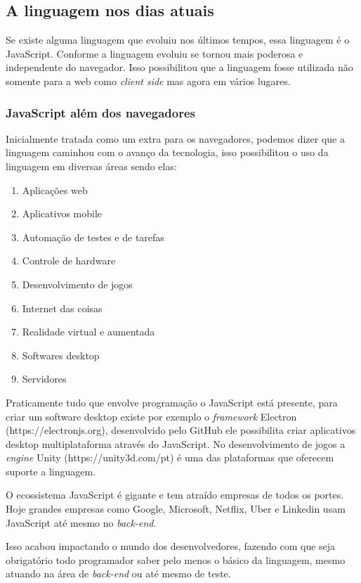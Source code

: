 \documentclass[
	12pt,				%
	openright,			%
	twoside,			%
	a4paper,			%
	english,			%
	brazil				%
	]{abntex2}
\begin{document}
\subsection{A linguagem nos dias atuais}

Se existe alguma linguagem que evoluiu nos últimos tempos, essa linguagem é o JavaScript. Conforme a linguagem evoluiu se tornou mais poderosa e independente do navegador. Isso possibilitou que a linguagem fosse utilizada não somente para a web como \textit{client side} mas agora em vários lugares. 

\subsubsection{JavaScript além dos navegadores}

Inicialmente tratada como um extra para os navegadores, podemos dizer que a linguagem caminhou com o avanço da tecnologia, isso possibilitou o uso da linguagem em diversas áreas sendo elas:

\begin{enumerate}[label=\alph*)]
\item Aplicações web
\item Aplicativos mobile 
\item Automação de testes e de tarefas
\item Controle de hardware
\item Desenvolvimento de jogos
\item Internet das coisas
\item Realidade virtual e aumentada
\item Softwares desktop
\item Servidores 
\end{enumerate}

Praticamente tudo que envolve programação o JavaScript está presente, para criar um software desktop existe por exemplo o \textit{framework} Electron (https://electronjs.org), desenvolvido pelo GitHub ele possibilita criar aplicativos desktop multiplataforma através do JavaScript. No desenvolvimento de jogos a \textit{engine} Unity (https://unity3d.com/pt) é uma das plataformas que oferecem suporte a linguagem.

O ecossistema JavaScript é gigante e tem atraído empresas de todos os portes. Hoje grandes empresas como Google, Microsoft, Netflix, Uber e Linkedin usam JavaScript até mesmo no \textit{back-end}. 

Isso acabou impactando o mundo dos desenvolvedores, fazendo com que seja obrigatório todo programador saber pelo menos o básico da linguagem, mesmo atuando na área de \textit{back-end} ou até mesmo de teste.
\end{document}
